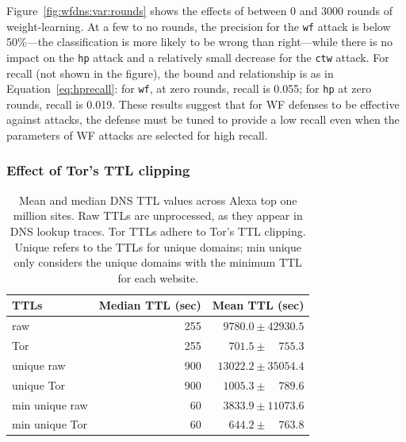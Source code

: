 Figure~\ref{fig:wfdns:var:rounds} shows the effects of between 0 and 3000
rounds of weight-learning. At a few to no rounds, the precision for the \texttt{wf}
attack is below 50\%---the classification is more likely to be wrong than
right---while there is no impact on the \texttt{hp} attack and a relatively
small decrease for the \texttt{ctw} attack.
For recall (not shown in the figure), the bound and relationship is
as in Equation~\ref{eq:hprecall}: for \texttt{wf}, at zero rounds, recall is 0.055; for
\texttt{hp} at zero rounds, recall is 0.019. These results suggest that for WF defenses to
be effective against \name attacks, the defense must be tuned to provide a
low recall even when the parameters of WF attacks are selected for high
recall.

\subsubsection{Effect of Tor's TTL clipping}

\begin{table}[t]
\centering
\begin{tabular}{l r r}
\toprule
\textbf{TTLs} & \textbf{Median TTL (sec)} & \textbf{Mean TTL (sec)} \\
\midrule
raw & 255 & $9780.0\pm42930.5$ \\ %
Tor & 255 & $701.5\pm\phantom{00}755.3$ \\ %
unique raw & 900 & $13022.2\pm35054.4$ \\ %
unique Tor & 900 & $1005.3\pm\phantom{00}789.6$ \\ %
min unique raw & 60 & $3833.9\pm11073.6$ \\ %
min unique Tor & 60 & $644.2\pm\phantom{00}763.8$ \\ %
\bottomrule
\end{tabular}
\caption{Mean and median DNS TTL values across Alexa top one million
  sites. Raw TTLs are unprocessed, as they appear in DNS lookup
  traces. Tor TTLs adhere to Tor's TTL clipping. 
Unique refers to the TTLs for unique domains; min unique only
considers the unique domains with the minimum TTL for each website.}
\label{tab:ttls}
\end{table}

